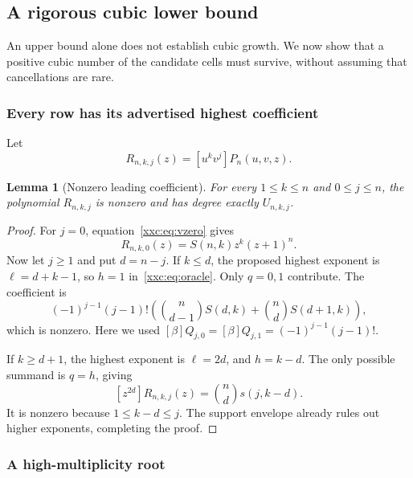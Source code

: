 \documentclass[11pt,a4paper]{article}
\numberwithin{equation}{section}
\newtheorem{lemma}[theorem]{Lemma}
\theoremstyle{definition}
\theoremstyle{remark}
\theoremstyle{plain}
\begin{document}
\subsection{A rigorous cubic lower bound}

An upper bound alone does not establish cubic growth. We now show that a
positive cubic number of the candidate cells must survive, without
assuming that cancellations are rare.

\subsubsection{Every row has its advertised highest coefficient}

Let
\[
 R_{n,k,j}(z)=[u^kv^j]P_n(u,v,z).
\]

\begin{lemma}[Nonzero leading coefficient]\label{xxc:lem:leading}
For every $1\le k\le n$ and $0\le j\le n$, the polynomial $R_{n,k,j}$ is
nonzero and has degree exactly $U_{n,k,j}$.
\end{lemma}
\begin{proof}
For $j=0$, equation~\eqref{xxc:eq:vzero} gives
\[
 R_{n,k,0}(z)=S(n,k)z^k(z+1)^n.
\]
Now let $j\ge1$ and put $d=n-j$. If $k\le d$, the proposed highest exponent
is $\ell=d+k-1$, so $h=1$ in~\eqref{xxc:eq:oracle}. Only $q=0,1$ contribute.
The coefficient is
\begin{equation}\label{xxc:eq:leadlowk}
 (-1)^{j-1}(j-1)!\left(
 \binom n{d-1}S(d,k)+\binom nd S(d+1,k)\right),
\end{equation}
which is nonzero. Here we used
$[\beta]Q_{j,0}=[\beta]Q_{j,1}=(-1)^{j-1}(j-1)!$.

If $k\ge d+1$, the highest exponent is $\ell=2d$, and $h=k-d$.
The only possible summand is $q=h$, giving
\begin{equation}\label{xxc:eq:leadhighk}
 [z^{2d}]R_{n,k,j}(z)=\binom nd s(j,k-d).
\end{equation}
It is nonzero because $1\le k-d\le j$. The support envelope already rules
out higher exponents, completing the proof.
\end{proof}

\subsubsection{A high-multiplicity root}
\end{document}
